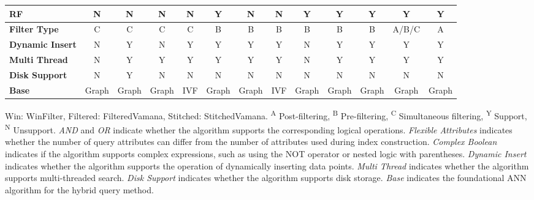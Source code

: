 \documentclass[sigconf, nonacm]{acmart}
\begin{document}
\begin{table}[t]
\begin{tabular}{|l|l|*{12}{c|}}
		\multicolumn{2}{|l|}{\textbf{RF}}             & N & N & N & N & Y & N & N & Y & Y & Y & Y & Y \\ \hline
			\multicolumn{2}{|l|}{\textbf{Filter Type }}             & C & C & C & C & B & B & B & B & B & B & A/B/C & A \\ \hline
		\multicolumn{2}{|l|}{\textbf{Dynamic Insert}} & N & Y & N & Y & Y & Y & Y & N & Y & Y & Y & Y \\ \hline
		\multicolumn{2}{|l|}{\textbf{Multi Thread}}   & N & Y & Y & Y & Y & Y & Y & N & Y & Y & Y & Y \\ \hline
		\multicolumn{2}{|l|}{\textbf{Disk Support}}           &N  & Y& N & N & N & N & N & N & N & N & N & N \\ \hline
		\multicolumn{2}{|l|}{\textbf{Base}}           & Graph & Graph & Graph & IVF & Graph & Graph & IVF & Graph & Graph & Graph & Graph & Graph \\ \hline
	\end{tabular}
		
%		
		
		
		\centering
		\footnotesize{
			\begin{minipage}{\linewidth}
				\vspace{0.1cm}
				Win: WinFilter, Filtered: FilteredVamana, Stitched: StitchedVamana. 
				\textsuperscript{A} Post-filtering, 
				\textsuperscript{B} Pre-filtering, 
				\textsuperscript{C} Simultaneous filtering, 
				\textsuperscript{Y} Support, 
				\textsuperscript{N} Unsupport. 
				\textit{AND} and \textit{OR} indicate whether the algorithm supports the corresponding logical operations.
				\textit{Flexible Attributes} indicates whether the number of query attributes can differ from the number of attributes used during index construction. 
				\textit{Complex Boolean} indicates if the algorithm supports complex expressions, such as using the NOT operator or nested logic with parentheses.
				\textit{Dynamic Insert} indicates whether the algorithm supports the operation of dynamically inserting data points.
				\textit{Multi Thread} indicates whether the algorithm supports multi-threaded search.
				\textit{Disk Support} indicates whether the algorithm supports disk storage.
				\textit{Base} indicates the foundational ANN algorithm for the hybrid query method.
		\end{minipage}}
		
	\end{table}
	
\end{document}
